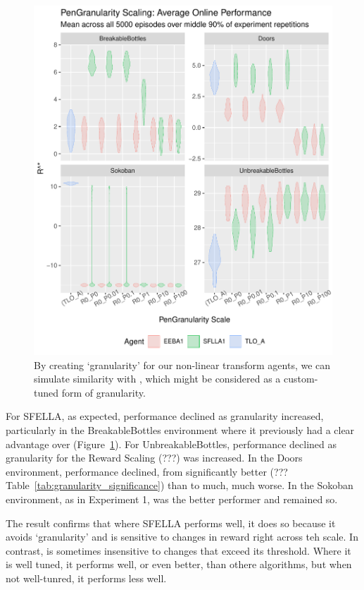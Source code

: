 \begin{figure}
  \includegraphics[width=\columnwidth]{output/multirun_n100_pilot_granularityonline_PenGranularity.pdf}
  \caption{By creating `granularity' for our non-linear transform agents, we can simulate similarity with \tloA{}, which might be considered as a custom-tuned form of granularity.
  }
   \label{fig:exp3_main}
 \end{figure}
 
For SFELLA, as expected, performance declined as granularity increased, particularly in the BreakableBottles environment where it previously had a clear advantage over \tloA{} (Figure~\ref{fig:exp3_main}). For UnbreakableBottles, performance declined as granularity for the Reward Scaling (???) was increased. In the Doors environment, performance declined, from significantly better (??? Table~\ref{tab:granularity_significance}) than \tloA{} to much, much worse. In the Sokoban environment, as in Experiment 1, \tloA{} was the better performer and remained so.

The result confirms that where SFELLA performs well, it does so because it avoids `granularity' and is sensitive to changes in reward right across teh scale. In contrast, \tloA{} is sometimes insensitive to changes that exceed its threshold. Where it is well tuned, it performs well, or even better, than othere algorithms, but when not well-tunred, it performs less well.



